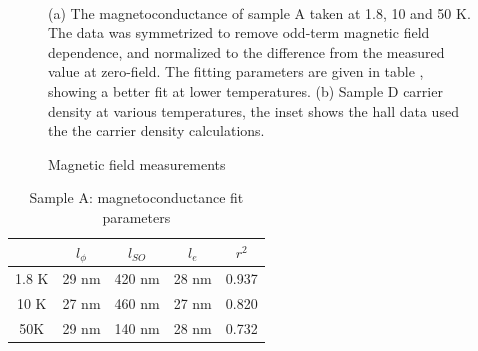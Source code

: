 \noindent 
\begin{figure}
\begin{centering}
~~
\par\end{centering}
\caption{Magnetic field measurements\label{fig:Magnetic-field-measurment}}

(a) The magnetoconductance of sample A taken at 1.8, 10 and 50 K.
The data was symmetrized to remove odd-term magnetic field dependence,
and normalized to the difference from the measured value at zero-field.
The fitting parameters are given in table \pageref{tab:Sample-A:-magnetoconductance},
showing a better fit at lower temperatures. (b) Sample D carrier density
at various temperatures, the inset shows the hall data used the the
carrier density calculations.
\end{figure}

\noindent 
\begin{table}
\begin{centering}
\begin{tabular}{|c|c|c|c|c|}
\hline 
 & $l_{\phi}$ & $l_{SO}$ & $l_{e}$ & $r^{2}$\tabularnewline
\hline 
\hline 
1.8 K & 29 nm & 420 nm & 28 nm & 0.937\tabularnewline
\hline 
10 K & 27 nm & 460 nm & 27 nm & 0.820\tabularnewline
\hline 
50K & 29 nm & 140 nm & 28 nm & 0.732\tabularnewline
\hline 
\end{tabular}
\par\end{centering}
\caption{Sample A: magnetoconductance fit parameters\label{tab:Sample-A:-magnetoconductance}}
\end{table}

